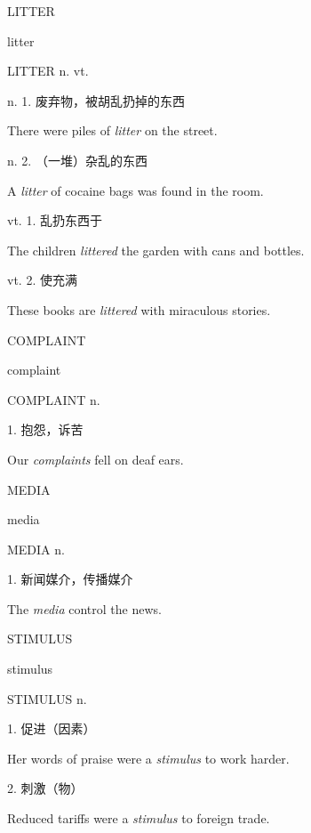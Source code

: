 \begin{flashcard}{
LITTER

litter
}
\begin{center}
LITTER n. vt. 
\end{center}
n. 1. 废弃物，被胡乱扔掉的东西

There were piles of \textit{litter} on the street.

n. 2. （一堆）杂乱的东西

A \textit{litter} of cocaine bags was found in the room.

vt. 1. 乱扔东西于

The children \textit{littered} the garden with cans and bottles.

vt. 2. 使充满

These books are \textit{littered} with miraculous stories.

\end{flashcard}
\begin{flashcard}{
COMPLAINT

complaint
}
\begin{center}
COMPLAINT n. 
\end{center}
1. 抱怨，诉苦

Our \textit{complaints} fell on deaf ears.

\end{flashcard}
\begin{flashcard}{
MEDIA

media
}
\begin{center}
MEDIA n. 
\end{center}
1. 新闻媒介，传播媒介

The \textit{media} control the news.

\end{flashcard}
\begin{flashcard}{
STIMULUS

stimulus
}
\begin{center}
STIMULUS n. 
\end{center}
1. 促进（因素）

Her words of praise were a \textit{stimulus} to work harder.

2. 刺激（物）

Reduced tariffs were a \textit{stimulus} to foreign trade.

\end{flashcard}
